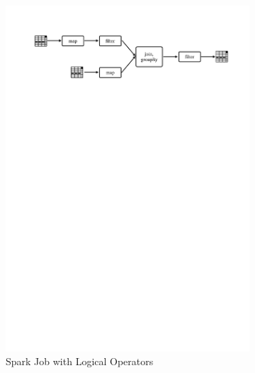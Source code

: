 \begin{figure}[!htbp]
    \centering
    \begin{subfigure}[b]{\linewidth}
        \centering
        \includegraphics[clip,trim=2.3cm 23.5cm 1.7cm 2.5cm,scale=0.8]{stage-logical.pdf}
        \caption{Spark Job with Logical Operators}
        \label{fig:sp:logical}
    \end{subfigure}
    \begin{subfigure}[b]{\linewidth}
        \centering

\end{subfigure}
\end{figure}

